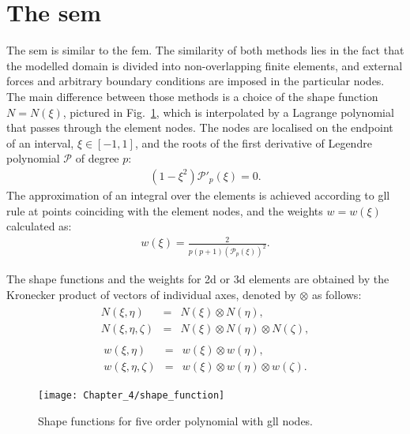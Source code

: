 \section{The \acs{sem}}
\label{sec:sem}


The \ac{sem} is similar to the \ac{fem}.
The similarity of both methods lies in the fact that the modelled domain is divided into non-overlapping finite elements, and external forces and arbitrary boundary conditions are imposed in the particular nodes.
The main difference between those methods is a choice of the shape function \( N=N(\xi )\), pictured in Fig.~\ref{fig:shape}, which is interpolated by a Lagrange polynomial that passes through the element nodes.
The nodes are localised on the endpoint of an interval, \(\xi\in[-1,1]\), and the roots of the first derivative of Legendre polynomial \(\mathcal{P}\) of degree \(p\):
\begin{eqnarray}
	(1-\xi^2)\mathcal{P}'_{p}(\xi)=0.
	\label{eq:nodes}
\end{eqnarray}
The approximation of an integral over the elements is achieved according to \ac{gll} rule at points coinciding with the element nodes, 
and the weights \(w=w(\xi)\) calculated as:
\begin{eqnarray}
	{w(\xi)} = \frac{2}{p(p+1)(\mathcal{P}_{p}(\xi))^2}.
	\label{eq:weight}
\end{eqnarray}

The shape functions and the weights for \ac{2d} or \ac{3d} elements are obtained by the Kronecker product of vectors of individual axes, denoted by \(\otimes\) as follows:
\begin{eqnarray}
	\begin{array}{rcl}
	N(\xi,\eta) & = & N(\xi)\otimes N(\eta),\\
	N(\xi,\eta,\zeta) & = & N(\xi)\otimes N(\eta)\otimes N(\zeta),
	\end{array}
\label{eq:shape_functions}
\end{eqnarray}
%
\begin{eqnarray}
	\begin{array}{rcl}
	w(\xi,\eta) & = & w(\xi)\otimes w(\eta),\\
	w(\xi,\eta,\zeta) & = & w(\xi)\otimes w(\eta)\otimes w(\zeta).
	\end{array}
	\label{eq:weights}
\end{eqnarray}
\begin{figure}[H]
	\begin{center}
		\texttt{[image: Chapter\_4/shape\_function]}
	\end{center}
	\caption{Shape functions for five order polynomial with \acf{gll} nodes.}
	\label{fig:shape}
\end{figure}

